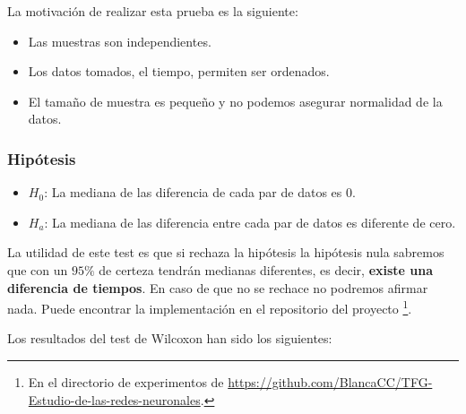   La motivación de realizar esta prueba es la siguiente: 
\begin{itemize}
    \item Las muestras son independientes.
    \item Los datos tomados, el tiempo, permiten ser ordenados. 
    \item El tamaño de muestra es pequeño y no podemos asegurar normalidad de la datos. 
\end{itemize}

\subsubsection*{Hipótesis} 

\begin{itemize}
    \item $H_0$: La mediana de las diferencia de cada par de datos es $0$. 
    \item $H_a$: La mediana de las diferencia entre cada par de datos es diferente de cero. 
\end{itemize}

La utilidad de este test es que si rechaza la hipótesis la hipótesis nula sabremos que con un $95 \%$ de certeza tendrán medianas diferentes, es decir, \textbf{existe una 
diferencia de tiempos}. En caso de que no se rechace no podremos afirmar nada.
Puede encontrar la implementación en el repositorio del
 proyecto \footnote{En el directorio de experimentos 
 de \url{https://github.com/BlancaCC/TFG-Estudio-de-las-redes-neuronales}.}.

 Los resultados del test de Wilcoxon han sido los siguientes: 

